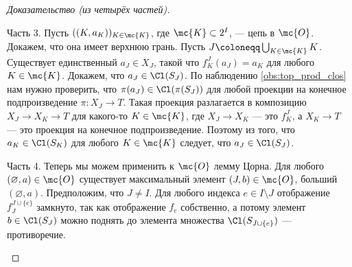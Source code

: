 \documentclass[
	extrafontsizes,
	11pt,
	hyphens,
]{memoir}
\begin{document}
\begin{proof}[Доказательство (из четырёх частей)]
\begin{proofdescription}
\item[Часть 3.]
Пусть \(((K, a_K))_{K \in \mc{K}}\), где \(\mc{K} \subset 2^I\), --- цепь в \(\mc{O}\). Докажем, что она имеет верхнюю грань.
Пусть \(J \coloneqq \bigcup_{K \in \mc{K}} K\).
Существует единственный \(a_J \in X_J\), такой что \(f^J_K (a_J) = a_K\) для любого \(K \in \mc{K}\).
Докажем, что \(a_J \in \Cl(S_J)\).
По наблюдению \ref{obs:top_prod_clos} нам нужно проверить, что \(\pi(a_J) \in \Cl(\pi(S_J))\) для любой проекции на конечное подпроизведение \(\pi : X_J \to T\).
Такая проекция разлагается в композицию \(X_J \to X_K \to T\) для какого-то \(K \in \mc{K}\), где \(X_J \to X_K\) --- это \(f^J_K\), а \(X_K \to T\) --- это проекция на конечное подпроизведение.
Поэтому из того, что \(a_K \in \Cl(S_K)\) для любого \(K \in \mc{K}\) следует, что \(a_J \in \Cl(S_J)\).

\item[Часть 4.]
Теперь мы можем применить к \(\mc{O}\) лемму Цорна.
Для любого \((\varnothing, a) \in \mc{O}\) существует максимальный элемент \((J, b) \in \mc{O}\), больший \((\varnothing, a)\).
Предположим, что \(J \neq I\).
Для любого индекса \(e \in I \setminus J\) отображение \(f^{J \cup \{e\}}_J\) замкнуто, так как отображение \(f_e\) собственно, а потому элемент \(b \in \Cl(S_J)\) можно поднять до элемента множества \(\Cl(S_{J \cup \{e\}})\) --- противоречие.
\qedhere

\end{proofdescription}
\end{proof}
\end{document}
